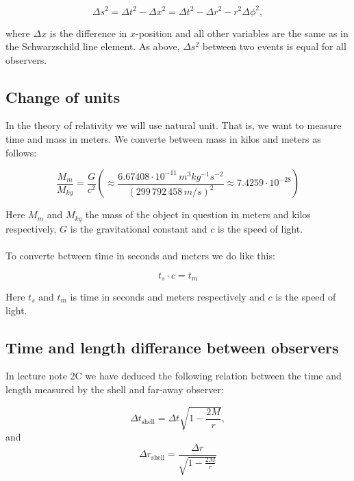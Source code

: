 \documentclass[a4paper,10pt,english]{article}
\begin{document}
\begin{equation}\label{eq:lorentz}
\Delta s^{2}=\Delta t^{2}-\Delta x^{2}=\Delta t^{2}-\Delta r^{2}-r^{2}\Delta\phi^{2},
\end{equation}

where $\Delta x$ is the difference in $x$-position and all other variables are the same as in the Schwarzschild line element. As above, $\Delta s^{2}$ between two events is equal for all observers.


\subsection*{Change of units}

In the theory of relativity we will use natural unit. That is, we want to measure time and mass in meters. We converte between mass in kilos and meters as follows:

\begin{equation}\label{eq:kg_to_m}
\frac{M_{m}}{M_{kg}}=\frac{G}{c^{2}}\left(\approx\frac{6.67408\cdot10^{-11}\,m^{3}kg^{-1}s^{-2}}{(299\,792\,458\,m/s)^{2}}\approx7.4259\cdot10^{-28}\right)
\end{equation}

Here $M_{m}$ and $M_{kg}$ the mass of the object in question in meters and kilos respectively, $G$ is the gravitational constant and $c$ is the speed of light.
\\
\\
To converte between time in seconds and meters we do like this:
 
\begin{equation}\label{eq:s_to_m}
t_{s}\cdot c=t_{m}
\end{equation}

Here $t_{s}$ and $t_{m}$ is time in seconds and meters respectively and $c$ is the speed of light.


\subsection*{Time and length differance between observers}

In lecture note 2C we have deduced the following relation between the time and length measured by the shell and far-away observer:

\begin{equation}\label{eq:shell_time}
\Delta t_{\text{shell}}=\Delta t\sqrt{1-\frac{2M}{r}},
\end{equation}
and
\begin{equation}\label{eq:shell_length}
\Delta r_{\text{shell}}=\frac{\Delta r}{\sqrt{1-\frac{2M}{r}}}
\end{equation}
\end{document}
